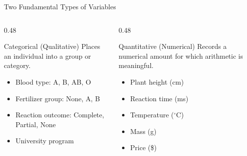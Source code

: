 \documentclass[aspectratio=169]{beamer}
\begin{document}
\begin{frame}{Two Fundamental Types of Variables}
  \begin{columns}[T]
    \begin{column}{0.48\textwidth}
      \begin{block}{Categorical (Qualitative)}
        Places an individual into a group or category.
        \begin{itemize}
          \item Blood type: A, B, AB, O
          \item Fertilizer group: None, A, B
          \item Reaction outcome: Complete, Partial, None
          \item University program
        \end{itemize}
      \end{block}
    \end{column}
    \begin{column}{0.48\textwidth}
      \begin{block}{Quantitative (Numerical)}
        Records a numerical amount for which arithmetic is meaningful.
        \begin{itemize}
          \item Plant height (cm)
          \item Reaction time (ms)
          \item Temperature ($^\circ$C)
          \item Mass (g)
          \item Price (\$)
        \end{itemize}
      \end{block}
    \end{column}
  \end{columns}
\end{frame}
\end{document}
